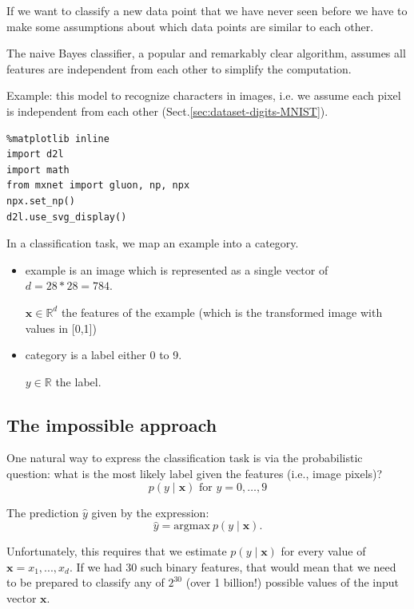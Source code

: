 If we want to classify a new data point that we have never seen before we have
to make some assumptions about which data points are similar to each other.
 
The naive Bayes classifier, a popular and remarkably clear algorithm, assumes
all features are independent from each other to simplify the computation.

Example: this model to recognize characters in images, i.e. we assume each pixel
is independent from each other (Sect.\ref{sec:dataset-digits-MNIST}).


\begin{lstlisting}
%matplotlib inline
import d2l
import math
from mxnet import gluon, np, npx
npx.set_np()
d2l.use_svg_display()
\end{lstlisting}

In a classification task, we map an example into a category. 
\begin{itemize}
  \item example is an image which is represented as a single vector of $d=28*28=784$.
  
  
 $\mathbf x\in\mathbb R^d$ the features of the example (which is the transformed image with values in [0,1])
  
  \item category is a label either 0 to 9.
  
  $y\in\mathbb R$ the label. 
  
\end{itemize}

\subsection{The impossible approach}

One natural way to express the classification task is via the probabilistic
question: what is the most likely label given the features (i.e., image pixels)?
\begin{equation}
p(y  \mid  \mathbf{x}) \text{ for } y=0, \ldots,9
\end{equation}

The prediction $\hat{y}$ given by the expression:
\begin{equation}
\hat{y} = \mathrm{argmax} \> p(y  \mid  \mathbf{x}).
\end{equation}

Unfortunately, this requires that we estimate $p(y  \mid  \mathbf{x})$ for every
value of $\mathbf{x} = x_1, ..., x_d$.
If we had $30$ such binary features, that would mean that we need to be prepared
to classify any of $2^{30}$ (over 1 billion!) possible values of the input
vector $\mathbf{x}$.

